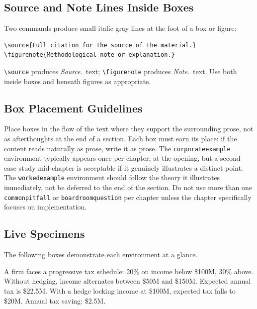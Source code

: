 \documentclass[11pt,openany]{book}
\newcommand{\code}[1]{\texttt{\small #1}}
\begin{document}
\subsection{Source and Note Lines Inside Boxes}

Two commands produce small italic gray lines at the foot of a box or figure:

\begin{lstlisting}
\source{Full citation for the source of the material.}
\figurenote{Methodological note or explanation.}
\end{lstlisting}

\code{\textbackslash source} produces \textit{Source.}~text; \code{\textbackslash figurenote} produces \textit{Note.}~text. Use both inside boxes and beneath figures as appropriate.

\subsection{Box Placement Guidelines}

Place boxes in the flow of the text where they support the surrounding prose, not as afterthoughts at the end of a section. Each box must earn its place: if the content reads naturally as prose, write it as prose. The \code{corporateexample} environment typically appears once per chapter, at the opening, but a second case study mid-chapter is acceptable if it genuinely illustrates a distinct point. The \code{workedexample} environment should follow the theory it illustrates immediately, not be deferred to the end of the section. Do not use more than one \code{commonpitfall} or \code{boardroomquestion} per chapter unless the chapter specifically focuses on implementation.

\subsection{Live Specimens}

The following boxes demonstrate each environment at a glance.

\begin{workedexample}
A firm faces a progressive tax schedule: 20\% on income below \$100M, 30\% above. Without hedging, income alternates between \$50M and \$150M. Expected annual tax is \$22.5M. With a hedge locking income at \$100M, expected tax falls to \$20M. Annual tax saving: \$2.5M.
\end{workedexample}
\end{document}
